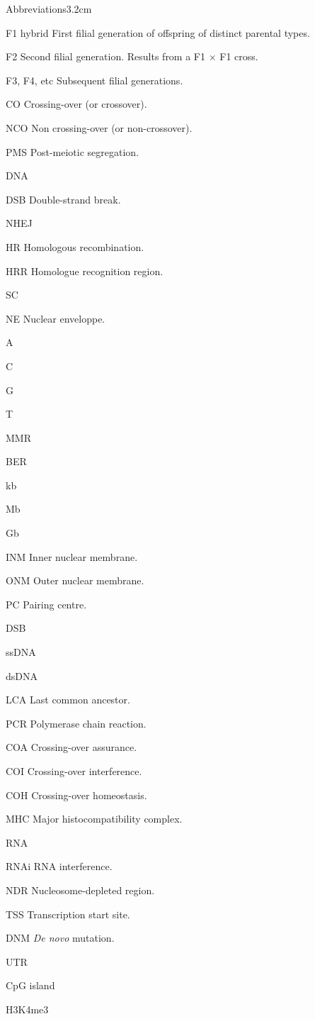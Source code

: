 
\begin{mclistof}{Abbreviations}{3.2cm}

\item[F1 hybrid] First filial generation of offspring of distinct parental types.
\item[F2] Second filial generation. Results from a F1 $\times$ F1 cross.
\item[F3, F4, etc] Subsequent filial generations.


\item[CO] Crossing-over (or crossover).
\item[NCO] Non crossing-over (or non-crossover).
\item[PMS] Post-meiotic segregation.
\item[DNA] 
\item[DSB] Double-strand break.
\item[NHEJ]
\item[HR] Homologous recombination.
\item[HRR] Homologue recognition region.
\item[SC] 
\item[NE] Nuclear enveloppe.
\item[A]
\item[C]
\item[G]
\item[T]
\item[MMR]
\item[BER]
\item[kb]
\item[Mb]
\item[Gb]
\item[INM] Inner nuclear membrane.
\item[ONM] Outer nuclear membrane.
\item[PC] Pairing centre.
\item[DSB]
\item[ssDNA]
\item[dsDNA]
\item[LCA] Last common ancestor.
\item[PCR] Polymerase chain reaction.
\item[COA] Crossing-over assurance.
\item[COI] Crossing-over interference.
\item[COH] Crossing-over homeostasis.
\item[MHC] Major histocompatibility complex.
\item[RNA]
\item[RNAi] RNA interference.
\item[NDR] Nucleosome-depleted region.
\item[TSS] Transcription start site.
\item[DNM] \textit{De novo} mutation.
\item[UTR]
\item[CpG island]
\item[H3K4me3]


\end{mclistof}
